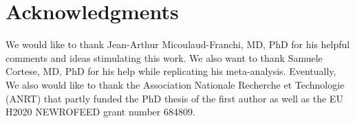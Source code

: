 
\section*{Acknowledgments}

We would like to thank Jean-Arthur Micoulaud-Franchi, MD, PhD for his helpful 
comments and ideas stimulating this work. We also want to thank Samuele Cortese, MD, PhD
for his help while replicating his meta-analysis. Eventually, We also would like to thank the Association Nationale 
Recherche et Technologie (ANRT) that partly funded the PhD thesis of the first author as well as the EU 
H2020 NEWROFEED grant number 684809.

